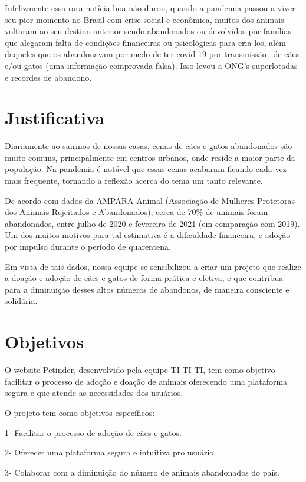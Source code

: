 Infelizmente essa rara notícia boa não durou, quando a pandemia passou a viver seu pior momento no Brasil com crise social e econômica, muitos dos animais voltaram ao seu destino anterior sendo abandonados ou devolvidos por famílias que alegaram falta de condições financeiras ou psicológicas para cria-los, além daqueles que os abandonavam por medo de ter covid-19 por transmissão  de cães e/ou gatos (uma informação comprovada falsa). Isso levou a ONG’s superlotadas e recordes de abandono.

\section{Justificativa}
Diariamente ao sairmos de nossas casas, cenas de cães e gatos abandonados são muito comuns, principalmente em centros urbanos, onde reside a maior parte da população. Na pandemia é notável que essas cenas acabaram ficando cada vez mais frequente, tornando a reflexão acerca do tema um tanto relevante.

De acordo com dados da AMPARA Animal (Associação de Mulheres Protetoras dos Animais Rejeitados e Abandonados), cerca de 70\% de animais foram abandonados, entre julho de 2020 e fevereiro de 2021 (em comparação com 2019). Um dos muitos motivos para tal estimativa é a dificuldade financeira, e adoção por impulso durante o período de quarentena.

Em vista de tais dados, nossa equipe se sensibilizou a criar um projeto que realize a doação e adoção de cães e gatos de forma prática e efetiva, e que contribua para a diminuição desses altos números de abandonos, de maneira consciente e solidária.
\section{Objetivos}
O website Petinder, desenvolvido pela equipe TI TI TI, tem como objetivo facilitar o processo de adoção e doação de animais  oferecendo uma plataforma segura e que atende as necessidades dos usuários.

O projeto tem como objetivos específicos:

1- Facilitar o processo de adoção de cães e gatos.

2- Oferecer uma plataforma segura e intuitiva pro usuário.

3- Colaborar com a diminuição do número de animais abandonados do país.

